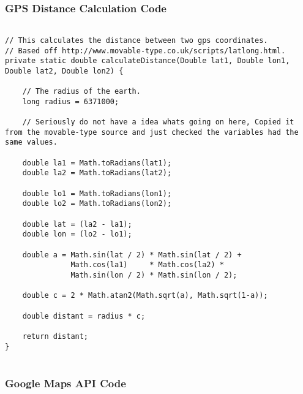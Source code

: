 \subsubsection*{GPS Distance Calculation Code}

\begin{lstlisting}

// This calculates the distance between two gps coordinates.
// Based off http://www.movable-type.co.uk/scripts/latlong.html.
private static double calculateDistance(Double lat1, Double lon1, Double lat2, Double lon2) {

    // The radius of the earth.
    long radius = 6371000;

    // Seriously do not have a idea whats going on here, Copied it from the movable-type source and just checked the variables had the same values.

    double la1 = Math.toRadians(lat1);
    double la2 = Math.toRadians(lat2);

    double lo1 = Math.toRadians(lon1);
    double lo2 = Math.toRadians(lon2);

    double lat = (la2 - la1);
    double lon = (lo2 - lo1);

    double a = Math.sin(lat / 2) * Math.sin(lat / 2) +
               Math.cos(la1)     * Math.cos(la2) *
               Math.sin(lon / 2) * Math.sin(lon / 2);

    double c = 2 * Math.atan2(Math.sqrt(a), Math.sqrt(1-a));

    double distant = radius * c;

    return distant;
}
 
\end{lstlisting}


\subsubsection*{Google Maps API Code}

